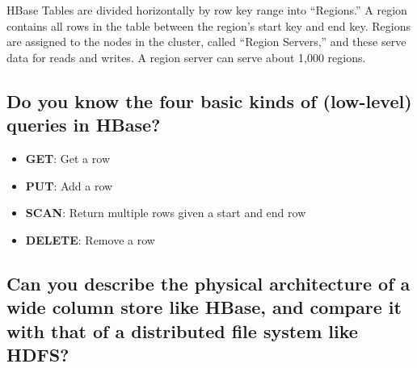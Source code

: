 \documentclass{article}
\begin{document}
HBase Tables are divided horizontally by row key range into “Regions.” A region contains all rows in the table between the region’s start key and end key. Regions are assigned to the nodes in the cluster, called “Region Servers,” and these serve data for reads and writes. A region server can serve about 1,000 regions.


\subsection{Do you know the four basic kinds of (low-level) queries in HBase?}

\begin{itemize}
    \item \textbf{GET}: Get a row
    \item \textbf{PUT}: Add a row
    \item \textbf{SCAN}: Return multiple rows given a start and end row
    \item \textbf{DELETE}: Remove a row
\end{itemize}

\subsection{Can you describe the physical architecture of a wide column store like HBase, and compare it with that of a distributed file system like HDFS?}
\end{document}
